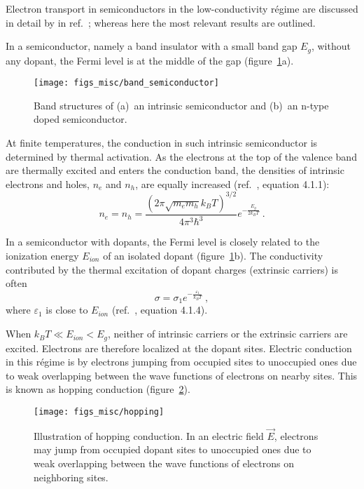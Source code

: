 Electron transport in semiconductors in the low-conductivity r\'egime are discussed in detail by \citeauthor{schklovskii_efros} in ref.~\cite{schklovskii_efros}; whereas here the most relevant results are outlined.

In a semiconductor, namely a band insulator with a small band gap $E_g$, without any dopant, the Fermi level is at the middle of the gap (figure~\ref{fig:band_semiconductor}a). %
\begin{figure}[ht]%
    \centering%
    \texttt{[image: figs\_misc/band\_semiconductor]}%
    \caption[Band structures of an intrinsic semiconductor and an n-type doped semiconductor]{\label{fig:band_semiconductor}Band structures of (a)~an intrinsic semiconductor and (b)~an n-type doped semiconductor.}%
\end{figure}%
%
At finite temperatures, the conduction in such intrinsic semiconductor is determined by thermal activation. As the electrons at the top of the valence band are thermally excited and enters the conduction band, the densities of intrinsic electrons and holes, $n_e$ and $n_h$, are equally increased (ref.~\cite{schklovskii_efros}, equation 4.1.1):%
\begin{equation}
    n_e = n_h = \frac{\left(2\pi\sqrt{m_e m_h}k_B T\right)^{3/2}}{4\pi^3\hbar^3}e^{-\frac{E_g}{2 k_B T}}~.
\end{equation}

In a semiconductor with dopants, the Fermi level is closely related to the ionization energy $E_{ion}$ of an isolated dopant (figure~\ref{fig:band_semiconductor}b). The conductivity contributed by the thermal excitation of dopant charges (extrinsic carriers) is often%
\begin{equation}
    \sigma = \sigma_1 e^{-\frac{\varepsilon_1}{k_B T}}~,
\end{equation}%
where $\varepsilon_1$ is close to $E_{ion}$ (ref.~\cite{schklovskii_efros}, equation 4.1.4).

When $k_B T \ll E_{ion} < E_g$, neither of intrinsic carriers or the extrinsic carriers are excited. Electrons are therefore localized at the dopant sites. Electric conduction in this r\'egime is by electrons jumping from occupied sites to unoccupied ones due to weak overlapping between the wave functions of electrons on nearby sites. This is known as hopping conduction (figure~\ref{fig:hopping}).%
\begin{figure}[ht]%
    \centering%
    \texttt{[image: figs\_misc/hopping]}%
    \caption[Illustration of hopping conduction]{\label{fig:hopping}Illustration of hopping conduction. In an electric field $\vec{E}$, electrons may jump from occupied dopant sites to unoccupied ones due to weak overlapping between the wave functions of electrons on neighboring sites.}%
\end{figure}%

